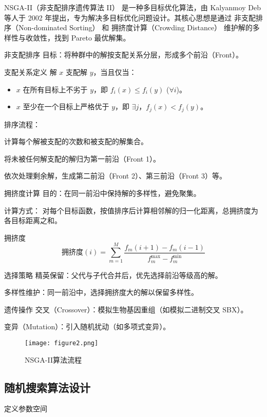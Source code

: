 NSGA-II（非支配排序遗传算法 II） 是一种多目标优化算法，由 Kalyanmoy Deb 等人于 2002 年提出，专为解决多目标优化问题设计。其核心思想是通过 非支配排序（Non-dominated Sorting） 和 拥挤度计算（Crowding Distance） 维护解的多样性与收敛性，找到 Pareto 最优解集。


非支配排序
目标：将种群中的解按支配关系分层，形成多个前沿（Front）。

支配关系定义
解 \( x \) 支配解 \( y \)，当且仅当：

\begin{itemize}
	\item \( x \) 在所有目标上不劣于 \( y \)，即 \( f_i(x) \leq f_i(y) \) (\( \forall i \))。
	\item \( x \) 至少在一个目标上严格优于 \( y \)，即 \( \exists j \)，\( f_j(x) < f_j(y) \)。
\end{itemize}

排序流程：

计算每个解被支配的次数和被支配的解集合。

将未被任何解支配的解归为第一前沿（Front 1）。

依次处理剩余解，生成第二前沿（Front 2）、第三前沿（Front 3）等。


拥挤度计算
目的：在同一前沿中保持解的多样性，避免聚集。

计算方式：
对每个目标函数，按值排序后计算相邻解的归一化距离，总拥挤度为各目标距离之和。

拥挤度
\begin{equation}
	\text{拥挤度}(i) = \sum_{m=1}^{M} \frac{f_m(i+1) - f_m(i-1)}{f_m^{\text{max}} - f_m^{\text{min}}}
\end{equation}


选择策略
精英保留：父代与子代合并后，优先选择前沿等级高的解。

多样性维护：同一前沿中，选择拥挤度大的解以保留多样性。


遗传操作
交叉（Crossover）：模拟生物基因重组（如模拟二进制交叉 SBX）。

变异（Mutation）：引入随机扰动（如多项式变异）。

\begin{figure}[htbp]
	\centering
	\texttt{[image: figure2.png]} %
	\caption{NSGA-II算法流程} %
	\label{fig:example} %
\end{figure}
\subsection{随机搜索算法设计}
定义参数空间



